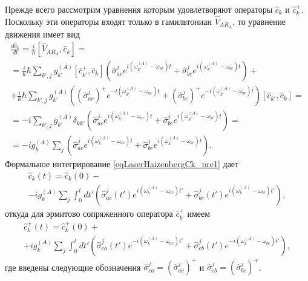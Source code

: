 Прежде всего рассмотрим уравнения которым удовлетворяют операторы
$\hat{c}_k$ и $\hat{c}_k^{+}$. Поскольку эти операторы входят только в
гамильтониан $\hat{V}_{AR_A}$, то уравнение движения имеет вид
\begin{eqnarray}
\frac{d \hat{c}_k}{d t} = \frac{i}{\hbar}\left[\hat{V}_{AR_A}, \hat{c}_k
\right] = 
\nonumber \\
= \frac{i}{\hbar} \hbar 
\sum_{k',j} 
g_{k'}^{(A)}\left[\hat{c}_{k'}^{+}, \hat{c}_k\right]
\left(
\hat{\sigma}_{ac}^{j} e^{i\left(\omega_{k'}^{(A)} - \omega_{ac}\right)t}
+
\hat{\sigma}_{bc}^{j} e^{i\left(\omega_{k'}^{(A)} - \omega_{bc}\right)t}
\right) +
\nonumber \\
+
\frac{i}{\hbar} \hbar 
\sum_{k',j} 
g_{k'}^{(A)}
\left(
\left(\hat{\sigma}_{ac}^{j}\right)^{+} e^{- i\left(\omega_{k'}^{(A)} - \omega_{ac}\right)t}
+
\left(\hat{\sigma}_{bc}^{j}\right)^{+} e^{- i\left(\omega_{k'}^{(A)} - \omega_{bc}\right)t}
\right)
\left[\hat{c}_{k'}, \hat{c}_k\right] =
\nonumber \\
= 
 - i 
\sum_{k',j} 
g_{k'}^{(A)}\delta_{kk'}
\left(
\hat{\sigma}_{ac}^{j} e^{i\left(\omega_{k'}^{(A)} - \omega_{ac}\right)t}
+
\hat{\sigma}_{bc}^{j} e^{i\left(\omega_{k'}^{(A)} - \omega_{bc}\right)t}
\right) = 
\nonumber \\
=
 - i g_{k}^{(A)}
\sum_{j} 
\left(
\hat{\sigma}_{ac}^{j} e^{i\left(\omega_{k}^{(A)} - \omega_{ac}\right)t}
+
\hat{\sigma}_{bc}^{j} e^{i\left(\omega_{k}^{(A)} - \omega_{bc}\right)t}
\right).
\label{eqLaserHaizenbergCk_pre1}
\end{eqnarray} 
Формальное интегрирование \eqref{eqLaserHaizenbergCk_pre1} дает
\begin{eqnarray}
\hat{c}_k\left(t\right) = \hat{c}_k\left(0\right) -
\nonumber \\
 - i g_{k}^{(A)}
\sum_{j} 
\int_0^t d t'
\left(
\hat{\sigma}_{ac}^{j}\left(t'\right) e^{i\left(\omega_{k}^{(A)} - \omega_{ac}\right)t'}
+
\hat{\sigma}_{bc}^{j}\left(t'\right) e^{i\left(\omega_{k}^{(A)} - \omega_{bc}\right)t'}
\right),
\label{eqLaserHaizenbergCk}
\end{eqnarray}
откуда для эрмитово сопряженного оператора $\hat{c}_k^{+}$ имеем
\begin{eqnarray}
\hat{c}_k^{+}\left(t\right) = \hat{c}_k^{+}\left(0\right) +
\nonumber \\
 + i g_{k}^{(A)}
\sum_{j} 
\int_0^t d t'
\left(
\hat{\sigma}_{ca}^{j}\left(t'\right) e^{-i\left(\omega_{k}^{(A)} - \omega_{ac}\right)t'}
+
\hat{\sigma}_{cb}^{j}\left(t'\right) e^{-i\left(\omega_{k}^{(A)} - \omega_{bc}\right)t'}
\right),
\label{eqLaserHaizenbergCkPlus}
\end{eqnarray}
где введены следующие обозначения $\hat{\sigma}_{ca}^{j} =
\left(\hat{\sigma}_{ac}^{j}\right)^{+}$ и
$\hat{\sigma}_{cb}^{j} = \left(\hat{\sigma}_{bc}^{j}\right)^{+}$.


